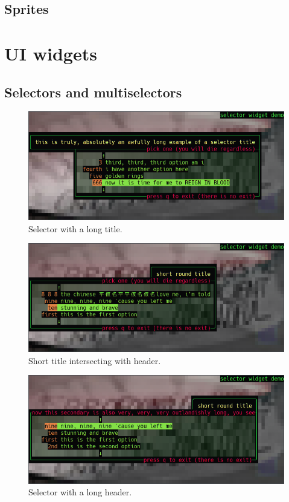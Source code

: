 \documentclass[letterpaper,10pt]{article}
\begin{document}
\subsection{Sprites}

\section{UI widgets}
\label{section:uiwidgets}
\subsection{Selectors and multiselectors}
\begin{figure}
    \centering
    \includegraphics[width=.75\linewidth]{media/selector1.png}
    \caption{Selector with a long title.}
\end{figure}

\begin{figure}
    \centering
    \includegraphics[width=.75\linewidth]{media/selector2.png}
    \caption{Short title intersecting with header.}
\end{figure}

\begin{figure}
  \centering \includegraphics[width=.75\linewidth]{media/selector3.png}
    \caption{Selector with a long header.}
\end{figure}
\end{document}
